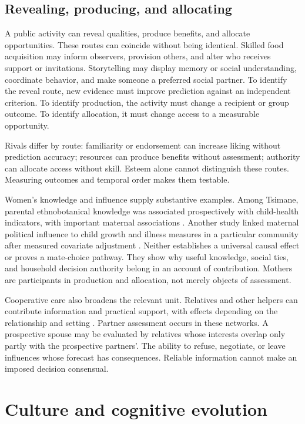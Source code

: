 \subsection{Revealing, producing, and allocating}

A public activity can reveal qualities, produce benefits, and allocate opportunities. These routes can coincide without being identical. Skilled food acquisition may inform observers, provision others, and alter who receives support or invitations. Storytelling may display memory or social understanding, coordinate behavior, and make someone a preferred social partner. To identify the reveal route, new evidence must improve prediction against an independent criterion. To identify production, the activity must change a recipient or group outcome. To identify allocation, it must change access to a measurable opportunity.

Rivals differ by route: familiarity or endorsement can increase liking without prediction accuracy; resources can produce benefits without assessment; authority can allocate access without skill. Esteem alone cannot distinguish these routes. Measuring outcomes and temporal order makes them testable.

Women's knowledge and influence supply substantive examples. Among Tsimane, parental ethnobotanical knowledge was associated prospectively with child-health indicators, with important maternal associations \citep{mcdade2007}. Another study linked maternal political influence to child growth and illness measures in a particular community after measured covariate adjustment \citep{alami2020}. Neither establishes a universal causal effect or proves a mate-choice pathway. They show why useful knowledge, social ties, and household decision authority belong in an account of contribution. Mothers are participants in production and allocation, not merely objects of assessment.

Cooperative care also broadens the relevant unit. Relatives and other helpers can contribute information and practical support, with effects depending on the relationship and setting \citep{sear2008}. Partner assessment occurs in these networks. A prospective spouse may be evaluated by relatives whose interests overlap only partly with the prospective partners'. The ability to refuse, negotiate, or leave influences whose forecast has consequences. Reliable information cannot make an imposed decision consensual.

\section{Culture and cognitive evolution}\label{sec:minds-evolution}

